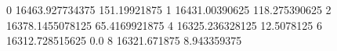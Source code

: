 0 16463.927734375 151.19921875
1 16431.00390625 118.275390625
2 16378.1455078125 65.4169921875
4 16325.236328125 12.5078125
6 16312.728515625 0.0
8 16321.671875 8.943359375
